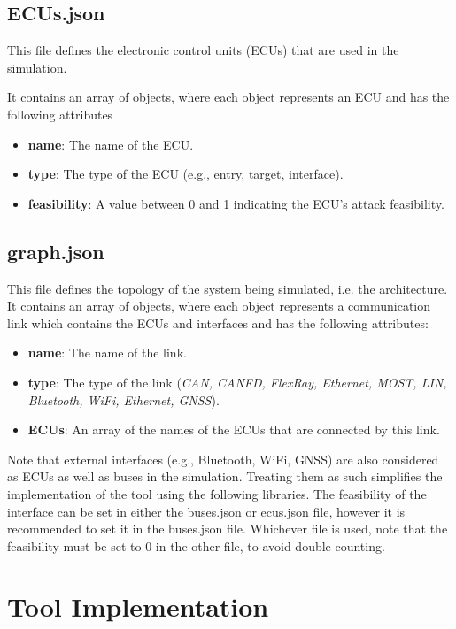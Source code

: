 \subsection{ECUs.json}
\label{sec:ECUs}

This file defines the electronic control units (ECUs) that are used in the simulation. 

It contains an array of objects, where each object represents an ECU and has the following attributes

\begin{itemize}
\item \textbf{name}: The name of the ECU.
\item \textbf{type}: The type of the ECU (e.g., entry, target, interface).
\item \textbf{feasibility}: A value between 0 and 1 indicating the ECU's attack feasibility.
\end{itemize}

\subsection{graph.json}
\label{sec:graph}

This file defines the topology of the system being simulated, i.e. the architecture. 
It contains an array of objects, where each object represents a communication link which contains the ECUs and interfaces and has the following attributes:

\begin{itemize}
\item \textbf{name}: The name of the link.
\item \textbf{type}: The type of the link (\textit{CAN, CANFD, FlexRay, Ethernet, MOST, LIN, Bluetooth, WiFi, Ethernet, GNSS}).
\item \textbf{ECUs}: An array of the names of the ECUs that are connected by this link.
\end{itemize}

Note that external interfaces (e.g., Bluetooth, WiFi, GNSS) are also considered as ECUs as well as buses in the simulation.
Treating them as such simplifies the implementation of the tool using the following libraries.
The feasibility of the interface can be set in either the buses.json or ecus.json file, however it is recommended to set it in the buses.json file.
Whichever file is used, note that the feasibility must be set to 0 in the other file, to avoid double counting.


\section{Tool Implementation}
\label{sec:implementation}

